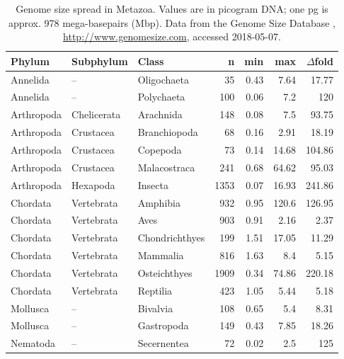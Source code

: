 \begin{table}
\centering\footnotesize
\caption[Genome size spread in Metazoa]{Genome size spread in Metazoa.
Values are in picogram DNA; one pg is approx. 978 mega-basepairs (Mbp).
Data from the Genome Size Database \citep{Gregory2018},
\url{http://www.genomesize.com}, accessed 2018-05-07.}
\label{tab:genome-size-spread}
\begin{tabular}{@{}lllrrrr@{}}
\toprule
Phylum     & Subphylum   & Class          & n    & min  & max   & $\Delta$fold \\
\midrule
Annelida   & --          & Oligochaeta    & 35   & 0.43 & 7.64  & 17.77  \\
Annelida   & --          & Polychaeta     & 100  & 0.06 & 7.2   & 120    \\
Arthropoda & Chelicerata & Arachnida      & 148  & 0.08 & 7.5   & 93.75  \\
Arthropoda & Crustacea   & Branchiopoda   & 68   & 0.16 & 2.91  & 18.19  \\
Arthropoda & Crustacea   & Copepoda       & 73   & 0.14 & 14.68 & 104.86 \\
Arthropoda & Crustacea   & Malacostraca   & 241  & 0.68 & 64.62 & 95.03  \\
Arthropoda & Hexapoda    & Insecta        & 1353 & 0.07 & 16.93 & 241.86 \\
Chordata   & Vertebrata  & Amphibia       & 932  & 0.95 & 120.6 & 126.95 \\
Chordata   & Vertebrata  & Aves           & 903  & 0.91 & 2.16  & 2.37   \\
Chordata   & Vertebrata  & Chondrichthyes & 199  & 1.51 & 17.05 & 11.29  \\
Chordata   & Vertebrata  & Mammalia       & 816  & 1.63 & 8.4   & 5.15   \\
Chordata   & Vertebrata  & Osteichthyes   & 1909 & 0.34 & 74.86 & 220.18 \\
Chordata   & Vertebrata  & Reptilia       & 423  & 1.05 & 5.44  & 5.18   \\
Mollusca   & --          & Bivalvia       & 108  & 0.65 & 5.4   & 8.31   \\
Mollusca   & --          & Gastropoda     & 149  & 0.43 & 7.85  & 18.26  \\
Nematoda   & --          & Secernentea    & 72   & 0.02 & 2.5   & 125    \\
\bottomrule
\end{tabular}
\end{table}

